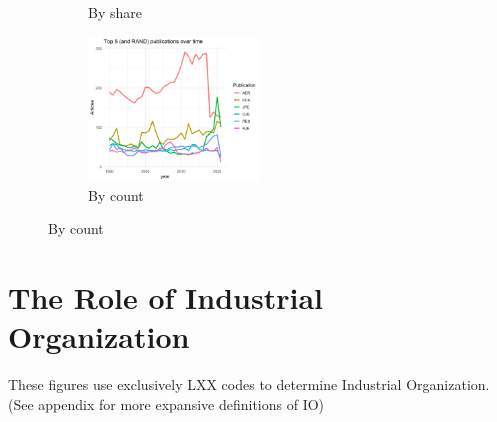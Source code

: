 \documentclass[11pt, letterpaper, twoside]{article}
\begin{document}
\begin{figure}
\begin{subfigure}[!htbp]{0.49\textwidth}
        \caption{By share}
    \end{subfigure}
    \begin{subfigure}[!htbp]{\textwidth}
        \centering
        \includegraphics[width=0.5\textwidth]{top5_over_time.png}
        \caption{By count}
    \end{subfigure}
\end{figure}



\section{The Role of Industrial Organization}

These figures use exclusively LXX codes to determine Industrial Organization. (See appendix for more expansive definitions of IO)
\end{document}
